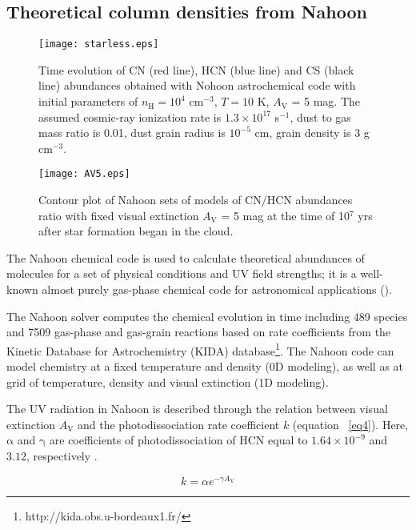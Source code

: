 \documentclass{aa}
\begin{document}
\subsection{Theoretical column densities from Nahoon}
\begin{figure} 
\centering 
\texttt{[image: starless.eps]} 
\caption{Time evolution of CN
(red line), HCN (blue line) and CS (black line) abundances obtained with Nohoon astrochemical code
with initial parameters of $n_\mathrm{H} = 10^4$ cm$^{-3}$, $T = 10$ K, $A_\mathrm{V}$ =
5 mag. The assumed cosmic-ray ionization rate is $1.3\times10^{17}$ s$^{-1}$, dust to gas mass ratio
is 0.01, dust grain radius is $10^{-5}$ cm, grain density is 3 g cm$^{-3}$.} 
\label{starless}
\end{figure}
\begin{figure} 
\centering 
\texttt{[image: AV5.eps]} 
\caption{Contour plot of Nahoon sets
of models of CN/HCN abundances ratio with fixed visual extinction $A_\mathrm{V}$ = 5 mag at the time
of 10$^{7}$ yrs after star formation began in the cloud.} 
\label{AV5} 
\end{figure}
The Nahoon chemical code is used to calculate theoretical abundances of 
molecules for a set of physical conditions and UV field strengths; it is a well-known
almost purely gas-phase chemical code for astronomical applications (\citealt{Wak15}). 

The Nahoon solver computes the chemical evolution in time including 489 species
and 7509 gas-phase and gas-grain reactions based on rate coefficients from the Kinetic
Database for Astrochemistry (KIDA) database\footnote{http://kida.obs.u-bordeaux1.fr/}. 
The Nahoon code can model chemistry at a fixed temperature and density (0D modeling),
 as well as at grid of temperature,
density and visual extinction (1D modeling). 

The UV radiation in Nahoon is described through the relation
between visual extinction $A_\mathrm{V}$ and the photodissociation rate coefficient $k$
(equation ~\ref{eq4}). Here, $\mathrm{\alpha}$ and $\mathrm{\gamma}$ are coefficients
 of photodissociation of HCN equal to $1.64\times10^{-9}$ and $3.12$, respectively \citep{Hea17}.

\begin{equation} \label{eq5} 
k = \alpha e^{-\gamma A_\mathrm{V}} 
\end{equation} 
\end{document}

